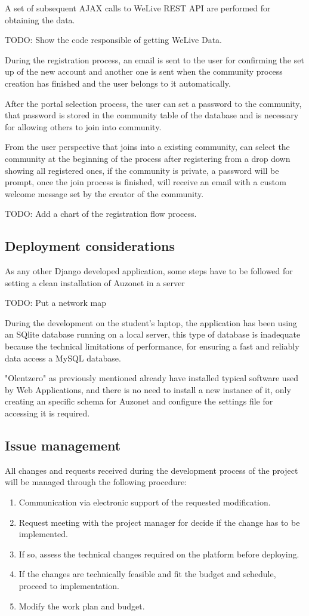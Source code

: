 \documentclass{DeustoFDP}
\begin{document}
A set of subsequent AJAX calls to WeLive REST API are performed for obtaining the data.

TODO: Show the code responsible of getting WeLive Data.

During the registration process, an email is sent to the user for confirming the set up of the new account and another one is sent when the community process creation has finished and the user belongs to it automatically.

After the portal selection process, the user can set a password to the community, that password is stored in the community table of the database and is necessary for allowing others to join into community.

From the user perspective that joins into a existing community, can select the community at the beginning of the process after registering from a drop down showing all registered ones, if the community is private, a password will be prompt, once the join process is finished, will receive an email with a custom welcome message set by the creator of the community.

TODO: Add a chart of the registration flow process.

\subsection{Deployment considerations}
As any other Django developed application, some steps have to be followed for setting a clean installation of Auzonet in a server

TODO: Put a network map

During the development on the student's laptop, the application has been using an SQlite database running on a local server, this type of database is inadequate because the technical limitations of performance, for ensuring a fast and reliably data access a MySQL database. 

"Olentzero" as previously mentioned already have installed typical software used by Web Applications, and there is no need to install a new instance of it, only creating an specific schema for Auzonet and configure the settings file for accessing it is required. 

\subsection{Issue management}
All changes and requests received during the development process of the project will be managed through the following procedure:
\begin{enumerate}
	\item Communication via electronic support of the requested modification.
	\item Request meeting with the project manager for decide if the change has to be implemented.
	\item If so, assess the technical changes required on the platform before deploying.
	\item If the changes are technically feasible and fit the budget and schedule, proceed to implementation.
	\item Modify the work plan and budget.
\end{enumerate}
\end{document}
